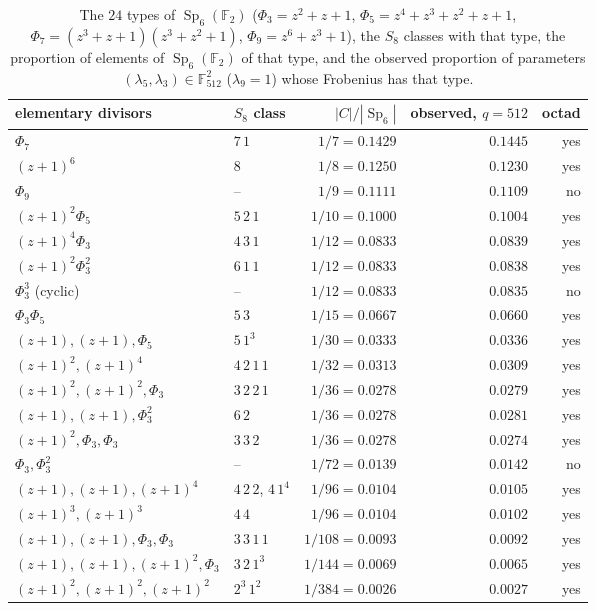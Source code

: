 \documentclass[12pt,a4paper]{amsart}
\theoremstyle{definition}
\newcommand{\F}{\mathbb{F}}
\newcommand{\Sp}{\operatorname{Sp}}
\begin{document}
\begin{table}[htbp]
\centering\footnotesize
\caption{The $24$ types of $\Sp_6(\F_2)$ ($\Phi_3=z^2+z+1$, $\Phi_5=z^4+z^3+z^2+z+1$, $\Phi_7=(z^3+z+1)(z^3+z^2+1)$, $\Phi_9=z^6+z^3+1$), the $S_8$ classes with that type, the proportion of elements of $\Sp_6(\F_2)$ of that type, and the observed proportion of parameters $(\lambda_5,\lambda_3)\in\F_{512}^2$ ($\lambda_9=1$) whose Frobenius has that type.}\label{tab:types}
\begin{tabular}{llrrr}
\toprule
elementary divisors & $S_8$ class & $|C|/|\Sp_6|$ & observed, $q=512$ & octad\\
\midrule
$\Phi_7$ & $7\,1$ & $1/7=0.1429$ & $0.1445$ & yes\\
$(z+1)^6$ & $8$ & $1/8=0.1250$ & $0.1230$ & yes\\
$\Phi_9$ & -- & $1/9=0.1111$ & $0.1109$ & no\\
$(z+1)^2\Phi_5$ & $5\,2\,1$ & $1/10=0.1000$ & $0.1004$ & yes\\
$(z+1)^4\Phi_3$ & $4\,3\,1$ & $1/12=0.0833$ & $0.0839$ & yes\\
$(z+1)^2\Phi_3^2$ & $6\,1\,1$ & $1/12=0.0833$ & $0.0838$ & yes\\
$\Phi_3^3$ (cyclic) & -- & $1/12=0.0833$ & $0.0835$ & no\\
$\Phi_3\Phi_5$ & $5\,3$ & $1/15=0.0667$ & $0.0660$ & yes\\
$(z+1),(z+1),\Phi_5$ & $5\,1^3$ & $1/30=0.0333$ & $0.0336$ & yes\\
$(z+1)^2,(z+1)^4$ & $4\,2\,1\,1$ & $1/32=0.0313$ & $0.0309$ & yes\\
$(z+1)^2,(z+1)^2,\Phi_3$ & $3\,2\,2\,1$ & $1/36=0.0278$ & $0.0279$ & yes\\
$(z+1),(z+1),\Phi_3^2$ & $6\,2$ & $1/36=0.0278$ & $0.0281$ & yes\\
$(z+1)^2,\Phi_3,\Phi_3$ & $3\,3\,2$ & $1/36=0.0278$ & $0.0274$ & yes\\
$\Phi_3,\Phi_3^2$ & -- & $1/72=0.0139$ & $0.0142$ & no\\
$(z+1),(z+1),(z+1)^4$ & $4\,2\,2$, $4\,1^4$ & $1/96=0.0104$ & $0.0105$ & yes\\
$(z+1)^3,(z+1)^3$ & $4\,4$ & $1/96=0.0104$ & $0.0102$ & yes\\
$(z+1),(z+1),\Phi_3,\Phi_3$ & $3\,3\,1\,1$ & $1/108=0.0093$ & $0.0092$ & yes\\
$(z+1),(z+1),(z+1)^2,\Phi_3$ & $3\,2\,1^3$ & $1/144=0.0069$ & $0.0065$ & yes\\
$(z+1)^2,(z+1)^2,(z+1)^2$ & $2^3\,1^2$ & $1/384=0.0026$ & $0.0027$ & yes\\

\end{tabular}
\end{table}
\end{document}

